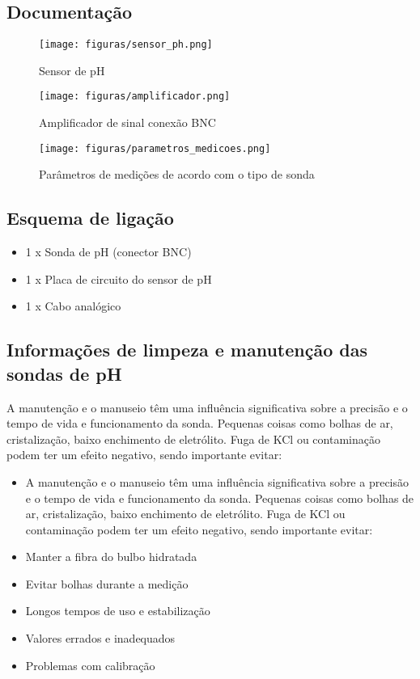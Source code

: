 \subsection{Documentação}

\begin{figure}[H]
	\centering
	\texttt{[image: figuras/sensor\_ph.png]}
	\caption{Sensor de pH}
	\label{sensor_ph}
\end{figure}

\begin{figure}[H]
	\centering
	\texttt{[image: figuras/amplificador.png]}
	\caption{Amplificador de sinal conexão BNC}
	\label{amplificador}
\end{figure}

\begin{figure}[H]
	\centering
	\texttt{[image: figuras/parametros\_medicoes.png]}
	\caption{Parâmetros de medições de acordo com o tipo de sonda}
	\label{parametros_medicoes}
\end{figure}

\subsection{Esquema de ligação}

\begin{itemize}
	\item 1 x Sonda de pH (conector BNC)
	\item 1 x Placa de circuito do sensor de pH
	\item 1 x Cabo analógico
\end{itemize}

\subsection{Informações de limpeza e manutenção das sondas de pH}

A manutenção e o manuseio têm uma influência significativa sobre a precisão e o tempo de vida
e funcionamento da sonda. Pequenas coisas como bolhas de ar, cristalização, baixo enchimento de
eletrólito. Fuga de KCl ou contaminação podem ter um efeito negativo, sendo importante evitar:

\begin{itemize}
	\item A manutenção e o manuseio têm uma influência significativa sobre a precisão e o tempo de vida
	e funcionamento da sonda. Pequenas coisas como bolhas de ar, cristalização, baixo enchimento de
	eletrólito. Fuga de KCl ou contaminação podem ter um efeito negativo, sendo importante evitar:
	\item Manter a fibra do bulbo hidratada
	\item Evitar bolhas durante a medição
	\item Longos tempos de uso e estabilização
	\item Valores errados e inadequados
	\item Problemas com calibração
\end{itemize}

